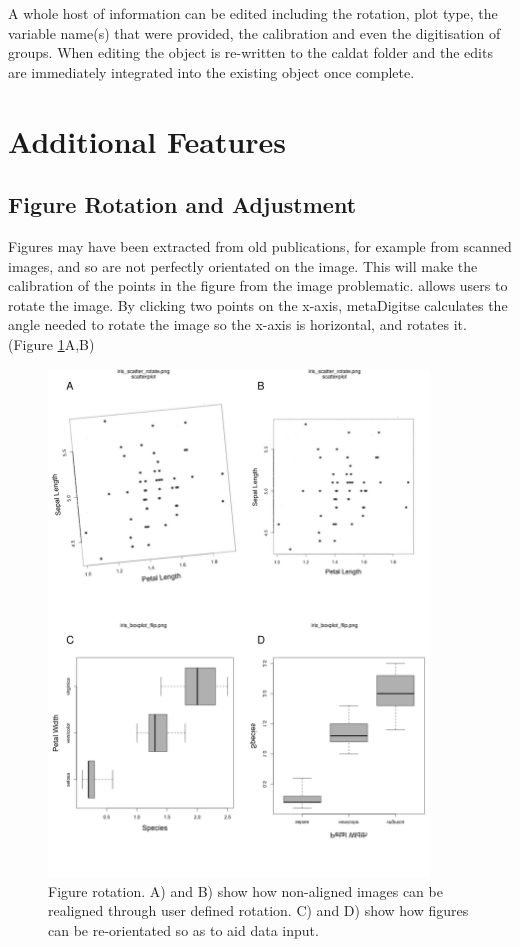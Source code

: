 \documentclass[article]{jss}
\newcommand{\fct}[1]{\code{#1()}}
\begin{document}
A whole host of information can be edited including the rotation, plot type, the variable name(s) that were provided, the calibration and even the digitisation of groups. When editing the  object is re-written to the caldat folder and the edits are immediately integrated into the existing object once complete. 









\section{Additional Features}

\subsection{Figure Rotation and Adjustment}
Figures may have been extracted from old publications, for example from scanned images, and so are not perfectly orientated on the image. This will make the calibration of the points in the figure from the image problematic. \fct{metaDigitise} allows users to rotate the image. By clicking two points on the x-axis, metaDigitse calculates the angle needed to rotate the image so the x-axis is horizontal, and rotates it. (Figure \ref{fig:rotate}A,B)

\begin{figure}[!b] 
 \includegraphics[width=0.9\textwidth]{fig_rotate.pdf} 
 \caption{Figure rotation. A) and B) show how non-aligned images can be realigned through user defined rotation. C) and D) show how figures can be re-orientated so as to aid data input.}
\label{fig:rotate}
\end{figure}
\end{document}

